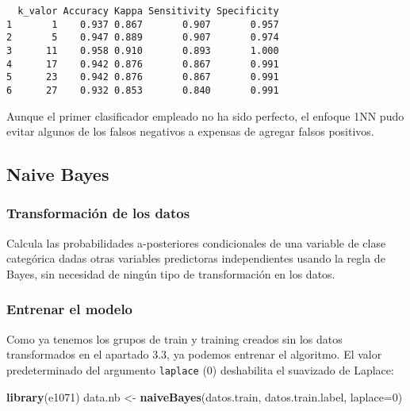 \documentclass[
]{article}
\newenvironment{Shaded}{\begin{snugshade}}{\end{snugshade}}
\newcommand{\DataTypeTok}[1]{\textcolor[rgb]{0.13,0.29,0.53}{#1}}
\newcommand{\DecValTok}[1]{\textcolor[rgb]{0.00,0.00,0.81}{#1}}
\newcommand{\KeywordTok}[1]{\textcolor[rgb]{0.13,0.29,0.53}{\textbf{#1}}}
\newcommand{\NormalTok}[1]{#1}
\newcommand{\StringTok}[1]{\textcolor[rgb]{0.31,0.60,0.02}{#1}}
\begin{document}
\begin{verbatim}
  k_valor Accuracy Kappa Sensitivity Specificity
1       1    0.937 0.867       0.907       0.957
2       5    0.947 0.889       0.907       0.974
3      11    0.958 0.910       0.893       1.000
4      17    0.942 0.876       0.867       0.991
5      23    0.942 0.876       0.867       0.991
6      27    0.932 0.853       0.840       0.991
\end{verbatim}

Aunque el primer clasificador empleado no ha sido perfecto, el enfoque
1NN pudo evitar algunos de los falsos negativos a expensas de agregar
falsos positivos.

\hypertarget{naive-bayes}{%
\subsection{Naive Bayes}\label{naive-bayes}}

\hypertarget{transformaciuxf3n-de-los-datos-1}{%
\subsubsection{Transformación de los
datos}\label{transformaciuxf3n-de-los-datos-1}}

Calcula las probabilidades a-posteriores condicionales de una variable
de clase categórica dadas otras variables predictoras independientes
usando la regla de Bayes, sin necesidad de ningún tipo de transformación
en los datos.

\hypertarget{entrenar-el-modelo-1}{%
\subsubsection{Entrenar el modelo}\label{entrenar-el-modelo-1}}

Como ya tenemos los grupos de train y training creados sin los datos
transformados en el apartado 3.3, ya podemos entrenar el algoritmo. El
valor predeterminado del argumento \texttt{laplace} (0) deshabilita el
suavizado de Laplace:

\begin{Shaded}
\begin{Highlighting}[]
\KeywordTok{library}\NormalTok{(e1071)}
\NormalTok{data.nb <-}\StringTok{ }\KeywordTok{naiveBayes}\NormalTok{(datos.train, datos.train.label, }\DataTypeTok{laplace=}\DecValTok{0}\NormalTok{)}
\end{Highlighting}
\end{Shaded}
\end{document}
